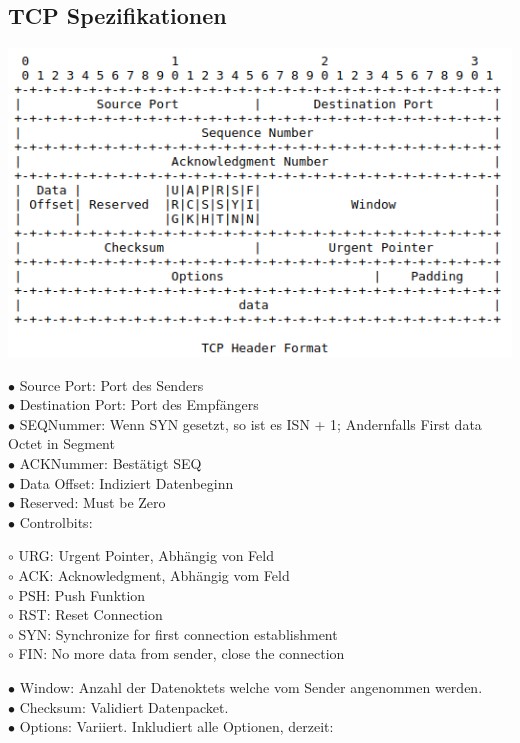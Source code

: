 \documentclass[11pt]{article}
\begin{document}
    \subsection{TCP Spezifikationen}
    \includegraphics[width=\textwidth]{graphics/TCPStruct.png}
    \begin{addmargin}[1em]{1em}
        $\bullet$ Source Port: Port des Senders\\
        $\bullet$ Destination Port: Port des Empfängers\\
        $\bullet$ SEQNummer: Wenn SYN gesetzt, so ist es ISN + 1; Andernfalls First data Octet in Segment\\
        $\bullet$ ACKNummer: Bestätigt SEQ\\
        $\bullet$ Data Offset: Indiziert Datenbeginn\\
        $\bullet$ Reserved: Must be Zero\\
        $\bullet$ Controlbits:
        \begin{addmargin}[1em]{1em}
            $\circ$ URG: Urgent Pointer, Abhängig von Feld\\
            $\circ$ ACK: Acknowledgment, Abhängig vom Feld\\
            $\circ$ PSH: Push Funktion\\
            $\circ$ RST: Reset Connection\\
            $\circ$ SYN: Synchronize for first connection establishment\\
            $\circ$ FIN: No more data from sender, close the connection
        \end{addmargin}
        $\bullet$ Window: Anzahl der Datenoktets welche vom Sender angenommen werden.\\
        $\bullet$ Checksum: Validiert Datenpacket.\\
        $\bullet$ Options: Variiert. Inkludiert alle Optionen, derzeit:
    \end{addmargin}
\end{document}
